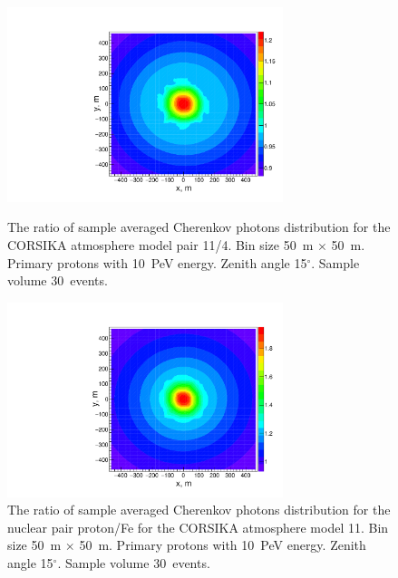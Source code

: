 \documentclass[universe,article,submit,moreauthors,pdftex]{Definitions/mdpi}
\begin{document}
\begin{paracol}{2}
\begin{figure}[tb]
    \begin{minipage}[t]{0.48\textwidth}
        \centering
        \includegraphics[width=19pc]{10PeV_pro_15deg_m11_over_m04=}
        \caption{The ratio of sample averaged Cherenkov photons distribution for the CORSIKA atmosphere model pair 11/4. Bin size 50~m $\times$ 50~m. Primary protons with 10~PeV energy. Zenith angle 15$^\circ$. Sample volume 30~events.}
        \label{fig:4d11}
    \end{minipage}
    \hfill
    \begin{minipage}[t]{0.48\textwidth}
        \centering
        \includegraphics[width=19pc]{10PeV_15deg_pro_over_Fe=}
        \caption{The ratio of sample averaged Cherenkov photons distribution for the nuclear pair proton/Fe for the CORSIKA atmosphere model 11. Bin size 50~m $\times$ 50~m. Primary protons with 10~PeV energy. Zenith angle 15$^\circ$. Sample volume 30~events.}
        \label{fig:pdFe}
    \end{minipage}
\end{figure}



\end{paracol}
\end{document}

